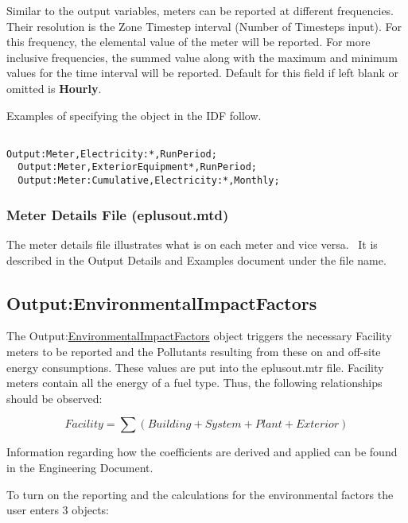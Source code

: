 Similar to the output variables, meters can be reported at different frequencies. Their resolution is the Zone Timestep interval (Number of Timesteps input). For this frequency, the elemental value of the meter will be reported. For more inclusive frequencies, the summed value along with the maximum and minimum values for the time interval will be reported. Default for this field if left blank or omitted is \textbf{Hourly}.

Examples of specifying the object in the IDF follow.

\begin{lstlisting}

Output:Meter,Electricity:*,RunPeriod;
  Output:Meter,ExteriorEquipment*,RunPeriod;
  Output:Meter:Cumulative,Electricity:*,Monthly;
\end{lstlisting}

\subsubsection{Meter Details File (eplusout.mtd)}\label{meter-details-file-eplusout.mtd}

The meter details file illustrates what is on each meter and vice versa.~ It is described in the Output Details and Examples document under the file name.

\subsection{Output:EnvironmentalImpactFactors}\label{outputenvironmentalimpactfactors}

The Output:\hyperref[environmentalimpactfactors]{EnvironmentalImpactFactors} object triggers the necessary Facility meters to be reported and the Pollutants resulting from these on and off-site energy consumptions. These values are put into the eplusout.mtr file. Facility meters contain all the energy of a fuel type. Thus, the following relationships should be observed:

\begin{equation}
Facility = \sum {\left( {Building + System + Plant + Exterior} \right)}
\end{equation}

Information regarding how the coefficients are derived and applied can be found in the Engineering Document.

To turn on the reporting and the calculations for the environmental factors the user enters 3 objects:

